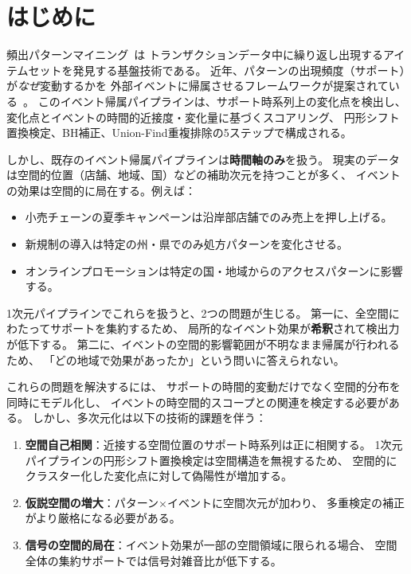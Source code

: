 \section{はじめに}\label{sec:intro}

頻出パターンマイニング~\cite{agrawal1994apriori,han2000mining}は
トランザクションデータ中に繰り返し出現するアイテムセットを発見する基盤技術である。
近年、パターンの出現頻度（サポート）が\emph{なぜ}変動するかを
外部イベントに帰属させるフレームワークが提案されている~\cite{dsaa2025}。
このイベント帰属パイプラインは、サポート時系列上の変化点を検出し、
変化点とイベントの時間的近接度・変化量に基づくスコアリング、
円形シフト置換検定、BH補正、Union-Find重複排除の5ステップで構成される。

しかし、既存のイベント帰属パイプラインは\textbf{時間軸のみ}を扱う。
現実のデータは空間的位置（店舗、地域、国）などの補助次元を持つことが多く、
イベントの効果は空間的に局在する。例えば：

\begin{itemize}
\item 小売チェーンの夏季キャンペーンは沿岸部店舗でのみ売上を押し上げる。
\item 新規制の導入は特定の州・県でのみ処方パターンを変化させる。
\item オンラインプロモーションは特定の国・地域からのアクセスパターンに影響する。
\end{itemize}

1次元パイプラインでこれらを扱うと、2つの問題が生じる。
第一に、全空間にわたってサポートを集約するため、
局所的なイベント効果が\textbf{希釈}されて検出力が低下する。
第二に、イベントの空間的影響範囲が不明なまま帰属が行われるため、
「どの地域で効果があったか」という問いに答えられない。

これらの問題を解決するには、
サポートの時間的変動だけでなく空間的分布を同時にモデル化し、
イベントの時空間的スコープとの関連を検定する必要がある。
しかし、多次元化は以下の技術的課題を伴う：

\begin{enumerate}
\item \textbf{空間自己相関}：近接する空間位置のサポート時系列は正に相関する。
1次元パイプラインの円形シフト置換検定は空間構造を無視するため、
空間的にクラスター化した変化点に対して偽陽性が増加する。

\item \textbf{仮説空間の増大}：パターン$\times$イベントに空間次元が加わり、
多重検定の補正がより厳格になる必要がある。

\item \textbf{信号の空間的局在}：イベント効果が一部の空間領域に限られる場合、
空間全体の集約サポートでは信号対雑音比が低下する。
\end{enumerate}

